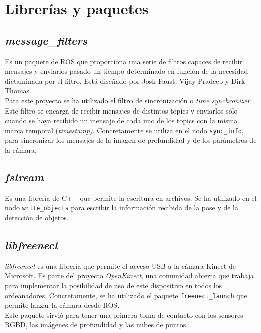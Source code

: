 \section{Librerías y paquetes}

\subsection{\textit{message\_filters}}

Es un paquete de ROS que proporciona una serie de filtros capaces de recibir mensajes y enviarlos pasado un tiempo determinado en función de la necesidad dictaminada por el filtro. Está diseñado por Josh Faust, Vijay Pradeep y Dirk Thomas.\\

Para este proyecto se ha utilizado el filtro de sincronización o \textit{time synchronizer}. Este filtro se encarga de recibir mensajes de distintos topics y enviarlos sólo cuando se haya recibido un mensaje de cada uno de los topics con la misma marca temporal (\textit{timestamp)}. Concretamente se utiliza en el nodo \texttt{sync\_info}, para sincronizar los mensajes de la imagen de profundidad y de los parámetros de la cámara. \\ 

\subsection{\textit{fstream}}

Es una librería de C++ que permite la escritura en archivos. Se ha utilizado en el nodo \texttt{write\_objects} para escribir la información recibida de la pose y de la detección de objetos.\\

\subsection{\textit{libfreenect}}

\textit{libfreenect} es una librería que permite el acceso USB a la cámara Kinect de Microsoft. Es parte del proyecto \textit{OpenKinect}, una comunidad abierta que trabaja para implementar la posibilidad de uso de este dispositivo en todos los ordeanadores. Concretamente, se ha utilizado el paquete \texttt{freenect\_launch} que permite lanzar la cámara desde ROS.\\

Este paquete sirvió para tener una primera toma de contacto con los sensores RGBD, las imágenes de profundidad y las nubes de puntos.\\

